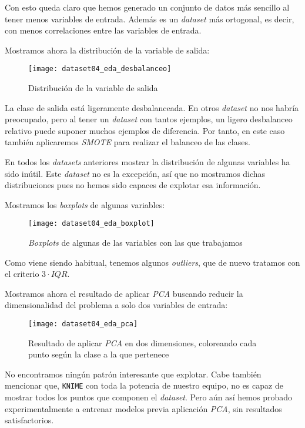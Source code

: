 \documentclass[11pt]{article}
\begin{document}
Con esto queda claro que hemos generado un conjunto de datos más sencillo al tener menos variables de entrada. Además es un \emph{dataset} más ortogonal, es decir, con menos correlaciones entre las variables de entrada.

Mostramos ahora la distribución de la variable de salida:

\begin{figure}[H]
    \centering
    \texttt{[image: dataset04\_eda\_desbalanceo]}
    \caption{Distribución de la variable de salida}
\end{figure}

La clase de salida está ligeramente desbalanceada. En otros \emph{dataset} no nos habría preocupado, pero al tener un \emph{dataset} con tantos ejemplos, un ligero desbalanceo relativo puede suponer muchos ejemplos de diferencia. Por tanto, en este caso también aplicaremos \emph{SMOTE} para realizar el balanceo de las clases.

En todos los \emph{datasets} anteriores mostrar la distribución de algunas variables ha sido inútil. Este \emph{dataset} no es la excepción, así que no mostramos dichas distribuciones pues no hemos sido capaces de explotar esa información.

Mostramos los \emph{boxplots} de algunas variables:

\begin{figure}[H]
    \centering
    \texttt{[image: dataset04\_eda\_boxplot]}
    \caption{\emph{Boxplots} de algunas de las variables con las que trabajamos}
\end{figure}

Como viene siendo habitual, tenemos algunos \emph{outliers}, que de nuevo tratamos con el criterio $3 \cdot IQR$.

Mostramos ahora el resultado de aplicar \emph{PCA} buscando reducir la dimensionalidad del problema a solo dos variables de entrada:

\begin{figure}[H]
    \centering
    \texttt{[image: dataset04\_eda\_pca]}
    \caption{Resultado de aplicar \emph{PCA} en dos dimensiones, coloreando cada punto según la clase a la que pertenece}
\end{figure}

No encontramos ningún patrón interesante que explotar. Cabe también mencionar que, \lstinline{KNIME} con toda la potencia de nuestro equipo, no es capaz de mostrar todos los puntos que componen el \emph{dataset}. Pero aún así hemos probado experimentalmente a entrenar modelos previa aplicación \emph{PCA}, sin resultados satisfactorios.
\end{document}
